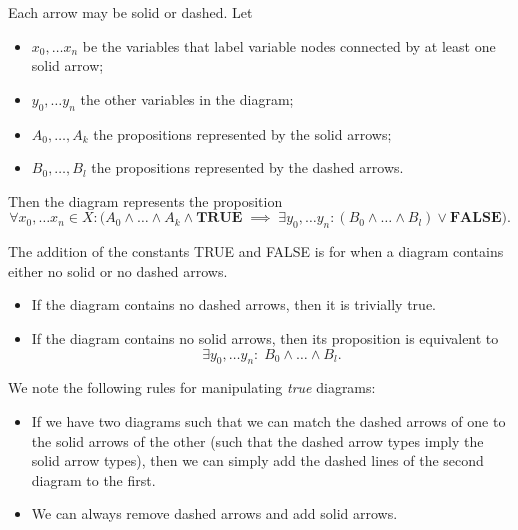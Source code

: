 \begin{definition}
Each arrow may be solid or dashed. Let
\begin{itemize}
\item $x_0, \ldots x_n$ be the variables that label variable nodes connected by at least one solid arrow;
\item $y_0,\ldots y_n$ the other variables in the diagram;
\item $A_0, \ldots, A_k$ the propositions represented by the solid arrows;
\item $B_0, \ldots, B_l$ the propositions represented by the dashed arrows.
\end{itemize}
Then the diagram represents the proposition
\[ \forall x_0, \ldots x_n \in X: \Big(A_0\land \ldots\land A_k \land\textbf{TRUE} \; \implies\; \exists y_0,\ldots y_n: (B_0\land \ldots \land B_l) \lor\textbf{FALSE} \Big). \]
\end{definition}

The addition of the constants TRUE and FALSE is for when a diagram contains either no solid or no dashed arrows.

\begin{itemize}
\item If the diagram contains no dashed arrows, then it is trivially true.
\item If the diagram contains no solid arrows, then its proposition is equivalent to
\[ \exists y_0,\ldots y_n: \; B_0\land \ldots \land B_l. \]
\end{itemize}

We note the following rules for manipulating \emph{true} diagrams:
\begin{itemize}
\item If we have two diagrams such that we can match the dashed arrows of one to the solid arrows of the other (such that the dashed arrow types imply the solid arrow types), then we can simply add the dashed lines of the second diagram to the first.
\item We can always remove dashed arrows and add solid arrows.
\end{itemize}

